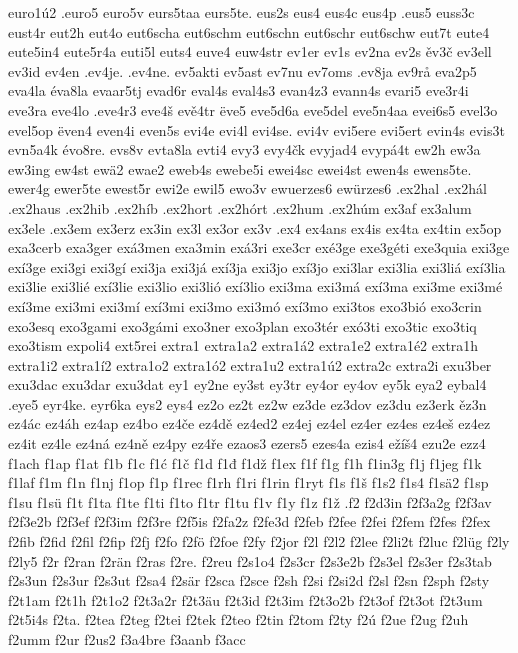 euro1ú2
.euro5
euro5v
eurs5taa
eurs5te.
eus2s
eus4
eus4c
eus4p
.eus5
euss3c
eust4r
eut2h
eut4o
eut6scha
eut6schm
eut6schn
eut6schr
eut6schw
eut7t
eute4
eute5in4
eute5r4a
euti5l
euts4
euve4
euw4str
ev1er
ev1s
ev2na
ev2s
ěv3č
ev3ell
ev3id
ev4en
.ev4je.
.ev4ne.
ev5akti
ev5ast
ev7nu
ev7oms
.ev8ja
ev9rå
eva2p5
eva4la
éva8la
evaar5tj
evad6r
eval4s
eval4s3
evan4z3
evann4s
evari5
eve3r4i
eve3ra
eve4lo
.eve4r3
eve4š
evě4tr
ëve5
eve5d6a
eve5del
eve5n4aa
evei6s5
evel3o
evel5op
ëven4
even4i
even5s
evi4e
evi4l
evi4se.
evi4v
evi5ere
evi5ert
evin4s
evis3t
evn5a4k
évo8re.
evs8v
evta8la
evti4
evy3
evy4čk
evyjad4
evypá4t
ew2h
ew3a
ew3ing
ew4st
ewä2
ewae2
eweb4s
ewebe5i
ewei4sc
ewei4st
ewen4s
ewens5te.
ewer4g
ewer5te
ewest5r
ewi2e
ewil5
ewo3v
ewuerzes6
ewürzes6
.ex2hal
.ex2hál
.ex2haus
.ex2hib
.ex2híb
.ex2hort
.ex2hórt
.ex2hum
.ex2húm
ex3af
ex3alum
ex3ele
.ex3em
ex3erz
ex3in
ex3l
ex3or
ex3v
.ex4
ex4ans
ex4is
ex4ta
ex4tin
ex5op
exa3cerb
exa3ger
exá3men
exa3min
exá3ri
exe3cr
exé3ge
exe3géti
exe3quia
exi3ge
exí3ge
exi3gi
exi3gí
exi3ja
exi3já
exí3ja
exi3jo
exí3jo
exi3lar
exi3lia
exi3liá
exí3lia
exi3lie
exi3lié
exí3lie
exi3lio
exi3lió
exí3lio
exi3ma
exi3má
exí3ma
exi3me
exi3mé
exí3me
exi3mi
exi3mí
exí3mi
exi3mo
exi3mó
exí3mo
exi3tos
exo3bió
exo3crin
exo3esq
exo3gami
exo3gámi
exo3ner
exo3plan
exo3tér
exó3ti
exo3tic
exo3tiq
exo3tism
expoli4
ext5rei
extra1
extra1a2
extra1á2
extra1e2
extra1é2
extra1h
extra1i2
extra1í2
extra1o2
extra1ó2
extra1u2
extra1ú2
extra2c
extra2i
exu3ber
exu3dac
exu3dar
exu3dat
ey1
ey2ne
ey3st
ey3tr
ey4or
ey4ov
ey5k
eya2
eybal4
.eye5
eyr4ke.
eyr6ka
eys2
eys4
ez2o
ez2t
ez2w
ez3de
ez3dov
ez3du
ez3erk
ěz3n
ez4ác
ez4áh
ez4ap
ez4bo
ez4če
ez4dě
ez4ed2
ez4ej
ez4el
ez4er
ez4es
ez4eš
ez4ez
ez4it
ez4le
ez4ná
ez4ně
ez4py
ez4ře
ezaos3
ezers5
ezes4a
ezis4
ežíš4
ezu2e
ezz4
f1ach
f1ap
f1at
f1b
f1c
f1ć
f1č
f1d
f1đ
f1dž
f1ex
f1f
f1g
f1h
f1in3g
f1j
f1jeg
f1k
f1laf
f1m
f1n
f1nj
f1op
f1p
f1rec
f1rh
f1ri
f1rin
f1ryt
f1s
f1š
f1s2
f1s4
f1sä2
f1sp
f1su
f1sü
f1t
f1ta
f1te
f1ti
f1to
f1tr
f1tu
f1v
f1y
f1z
f1ž
.f2
f2d3in
f2f3a2g
f2f3av
f2f3e2b
f2f3ef
f2f3im
f2f3re
f2f5is
f2fa2z
f2fe3d
f2feb
f2fee
f2fei
f2fem
f2fes
f2fex
f2fib
f2fid
f2fil
f2fip
f2fj
f2fo
f2fö
f2foe
f2fy
f2jor
f2l
f2l2
f2lee
f2li2t
f2luc
f2lüg
f2ly
f2ly5
f2r
f2ran
f2rän
f2ras
f2re.
f2reu
f2s1o4
f2s3cr
f2s3e2b
f2s3el
f2s3er
f2s3tab
f2s3un
f2s3ur
f2s3ut
f2sa4
f2sär
f2sca
f2sce
f2sh
f2si
f2si2d
f2sl
f2sn
f2sph
f2sty
f2t1am
f2t1h
f2t1o2
f2t3a2r
f2t3äu
f2t3id
f2t3im
f2t3o2b
f2t3of
f2t3ot
f2t3um
f2t5i4s
f2ta.
f2tea
f2teg
f2tei
f2tek
f2teo
f2tin
f2tom
f2ty
f2ú
f2ue
f2ug
f2uh
f2umm
f2ur
f2us2
f3a4bre
f3aanb
f3acc
